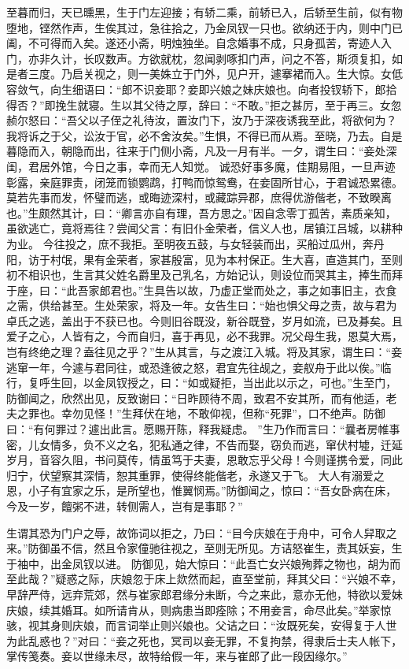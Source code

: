 \documentclass[a4paper,12pt,UTF8,twoside]{ctexbook}
\begin{document}
至暮而归，天已曛黑，生于门左迎接；有轿二乘，前轿已入，后轿至生前，似有物堕地，铿然作声，生俟其过，急往拾之，乃金凤钗一只也。欲纳还于内，则中门已阖，不可得而入矣。遂还小斋，明烛独坐。自念婚事不成，只身孤苦，寄迹人入门，亦非久计，长叹数声。方欲就枕，忽闻剥啄扣门声，问之不答，斯须复扣，如是者三度。乃启关视之，则一美姝立于门外，见户开，遽搴裙而入。生大惊。女低容敛气，向生细语曰：“郎不识妾耶？妾即兴娘之妹庆娘也。向者投钗轿下，郎拾得否？”即挽生就寝。生以其父待之厚，辞曰：“不敢。”拒之甚厉，至于再三。女忽赪尔怒曰：“吾父以子侄之礼待汝，置汝门下，汝乃于深夜诱我至此，将欲何为？我将诉之于父，讼汝于官，必不舍汝矣。”生惧，不得已而从焉。至晓，乃去。自是暮隐而入，朝隐而出，往来于门侧小斋，凡及一月有半。一夕，谓生曰：“妾处深闺，君居外馆，今日之事，幸而无人知觉。 诚恐好事多魔，佳期易阻，一旦声迹彰露，亲庭罪责，闭笼而锁鹦鹉，打鸭而惊鸳鸯，在妾固所甘心，于君诚恐累德。莫若先事而发，怀璧而逃，或晦迹深村，或藏踪异郡，庶得优游偕老，不致睽离也。”生颇然其计，曰：“卿言亦自有理，吾方思之。”因自念零丁孤苦，素质亲知，虽欲逃亡，竟将焉往？尝闻父言：有旧仆金荣者，信义人也，居镇江吕城，以耕种为业。 今往投之，庶不我拒。至明夜五鼓，与女轻装而出，买船过瓜州，奔丹阳，访于村氓，果有金荣者，家甚殷富，见为本村保正。生大喜，直造其门，至则初不相识也，生言其父姓名爵里及己乳名，方始记认，则设位而哭其主，捧生而拜于座，曰：“此吾家郎君也。”生具告以故，乃虚正堂而处之，事之如事旧主，衣食之需，供给甚至。生处荣家，将及一年。女告生曰：“始也惧父母之责，故与君为卓氏之逃，盖出于不获已也。今则旧谷既没，新谷既登，岁月如流，已及朞矣。且爱子之心，人皆有之，今而自归，喜于再见，必不我罪。况父母生我，恩莫大焉，岂有终绝之理？盍往见之乎？”生从其言，与之渡江入城。将及其家，谓生曰：“妾逃窜一年，今遽与君同往，或恐逢彼之怒，君宜先往觇之，妾舣舟于此以俟。”临行，复呼生回，以金凤钗授之，曰：“如或疑拒，当出此以示之，可也。”生至门，防御闻之，欣然出见，反致谢曰：“日昨顾待不周，致君不安其所，而有他适，老夫之罪也。幸勿见怪！”生拜伏在地，不敢仰视，但称“死罪”，口不绝声。防御曰：“有何罪过？遽出此言。愿赐开陈，释我疑虑。 ”生乃作而言曰：“曩者房帷事密，儿女情多，负不义之名，犯私通之律，不告而娶，窃负而逃，窜伏村墟，迁延岁月，音容久阻，书问莫传，情虽笃于夫妻，恩敢忘乎父母！今则谨携令爱，同此归宁，伏望察其深情，恕其重罪，使得终能偕老，永遂又于飞。 大人有溺爱之恩，小子有宜家之乐，是所望也，惟翼悯焉。”防御闻之，惊曰：“吾女卧病在床，今及一岁，饘粥不进，转侧需人，岂有是事耶？”

生谓其恐为门户之辱，故饰词以拒之，乃曰：“目今庆娘在于舟中，可令人舁取之来。”防御虽不信，然且令家僮驰往视之，至则无所见。方诘怒崔生，责其妖妄，生于袖中，出金凤钗以进。 防御见，始大惊曰：“此吾亡女兴娘殉葬之物也，胡为而至此哉？”疑惑之际，庆娘忽于床上欻然而起，直至堂前，拜其父曰：“兴娘不幸，早辞严侍，远弃荒郊，然与崔家郎君缘分未断，今之来此，意亦无他，特欲以爱妹庆娘，续其婚耳。如所请肯从，则病患当即痊除；不用妾言，命尽此矣。”举家惊骇，视其身则庆娘，而言词举止则兴娘也。父诘之曰：“汝既死矣，安得复于人世为此乱惑也？”对曰：“妾之死也，冥司以妾无罪，不复拘禁，得隶后士夫人帐下，掌传笺奏。妾以世缘未尽，故特给假一年，来与崔郎了此一段因缘尔。”
\end{document}
